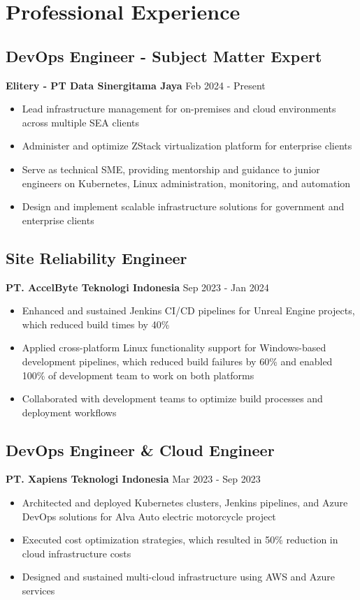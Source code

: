 \documentclass[11pt,a4paper]{article}
\newcommand{\company}[1]{\textbf{\color{primary}#1}}
\newcommand{\daterange}[1]{\color{secondary}#1}  %
\begin{document}
\section{Professional Experience}

\subsection{DevOps Engineer - Subject Matter Expert}
\company{Elitery - PT Data Sinergitama Jaya} \hfill \daterange{Feb 2024 - Present}
\begin{itemize}[leftmargin=*, itemsep=2pt]
    \item Lead infrastructure management for on-premises and cloud environments across multiple SEA clients
    \item Administer and optimize ZStack virtualization platform for enterprise clients
    \item Serve as technical SME, providing mentorship and guidance to junior engineers on Kubernetes, Linux administration, monitoring, and automation
    \item Design and implement scalable infrastructure solutions for government and enterprise clients
\end{itemize}

\subsection{Site Reliability Engineer}
\company{PT. AccelByte Teknologi Indonesia} \hfill \daterange{Sep 2023 - Jan 2024}
\begin{itemize}[leftmargin=*, itemsep=2pt]
                \item Enhanced and sustained Jenkins CI/CD pipelines for Unreal Engine projects, which reduced build times by 40\%
        \item Applied cross-platform Linux functionality support for Windows-based development pipelines, which reduced build failures by 60\% and enabled 100\% of development team to work on both platforms
    \item Collaborated with development teams to optimize build processes and deployment workflows
\end{itemize}

\subsection{DevOps Engineer \& Cloud Engineer}
\company{PT. Xapiens Teknologi Indonesia} \hfill \daterange{Mar 2023 - Sep 2023}
\begin{itemize}[leftmargin=*, itemsep=2pt]
    \item Architected and deployed Kubernetes clusters, Jenkins pipelines, and Azure DevOps solutions for Alva Auto electric motorcycle project
        \item Executed cost optimization strategies, which resulted in 50\% reduction in cloud infrastructure costs
        \item Designed and sustained multi-cloud infrastructure using AWS and Azure services
\end{itemize}
\end{document}

